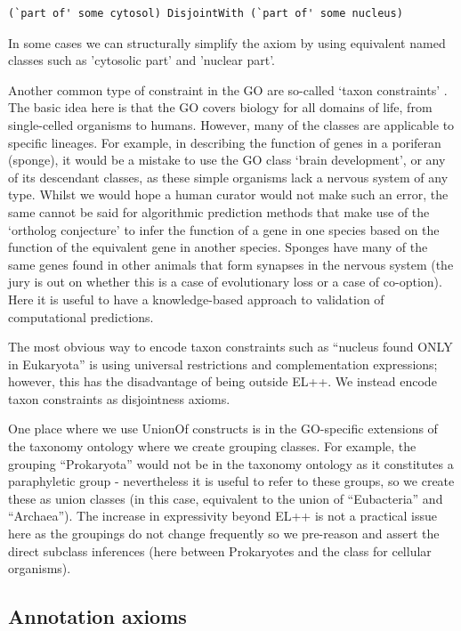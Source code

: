 \documentclass{llncs}
\begin{document}
\begin{verbatim}
(`part of' some cytosol) DisjointWith (`part of' some nucleus)
\end{verbatim}

In some cases we can structurally simplify the axiom by using
equivalent named classes such as 'cytosolic part' and 'nuclear
part'. 

Another common type of constraint in the GO are so-called `taxon
constraints' \cite{Deegan2010}. The basic idea here is that the GO
covers biology for all domains of life, from single-celled organisms
to humans. However, many of the classes are applicable to specific
lineages. For example, in describing the function of genes in a
poriferan (sponge), it would be a mistake to use the GO class ‘brain
development’, or any of its descendant classes, as these simple
organisms lack a nervous system of any type. Whilst we would hope a
human curator would not make such an error, the same cannot be said
for algorithmic prediction methods that make use of the `ortholog
conjecture'\cite{Thomas2012} to infer the function of a gene in one
species based on the function of the equivalent gene in another
species. Sponges have many of the same genes found in other animals
that form synapses in the nervous system (the jury is out on whether
this is a case of evolutionary loss or a case of co-option). Here it
is useful to have a knowledge-based approach to validation of
computational predictions.

The most obvious way to encode taxon constraints such as ``nucleus
found ONLY in Eukaryota'' is using universal restrictions and
complementation expressions; however, this has the disadvantage of
being outside EL++. We instead encode taxon constraints as
disjointness axioms\cite{taxonOWL}.

One place where we use UnionOf constructs is in the GO-specific
extensions of the taxonomy ontology where we create grouping
classes. For example, the grouping ``Prokaryota'' would not be
in the taxonomy ontology as it constitutes a paraphyletic group -
nevertheless it is useful to refer to these groups, so we
create these as union classes (in this case, equivalent to the union
of ``Eubacteria'' and ``Archaea''). The increase in expressivity
beyond EL++ is not a practical issue here as the groupings do not
change frequently so we pre-reason and assert the direct subclass
inferences (here between Prokaryotes and the class for cellular
organisms).

\subsection{Annotation axioms}
\end{document}
